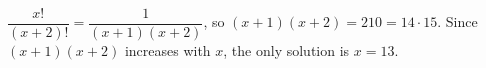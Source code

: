 $\dfrac{x!}{(x+2)!}=\dfrac1{(x+1)(x+2)}$, so $(x+1)(x+2)=210=14\cdot15$. Since $(x+1)(x+2)$ increases with $x$, the only solution is $x=\boxed{13}$.
